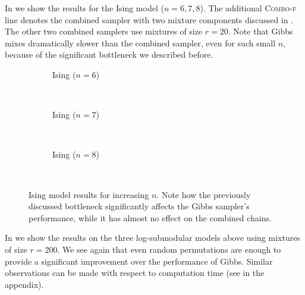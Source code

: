 In  we show the results for the Ising model ($n = 6, 7, 8$).
The additional \textsc{Combo-f} line denotes the combined sampler with two mixture components discussed in .
The other two combined samplers use mixtures of size $r = 20$.
Note that Gibbs mixes dramatically slower than the combined sampler, even for such small $n$, because of the significant bottleneck we described before.

\setlength{}
\setlength{}
\renewcommand{\subflen}{1.0\textwidth}
\begin{figure}[htbp]
  \begin{subfigure}[b]{\subflen}
    \centering
    
    \vspace{-0.5em}
    \caption{\textsf{Ising} ($n = 6$)}
    \label{fig:ising6}
  \end{subfigure}\\[1em]
  \begin{subfigure}[b]{\subflen}
    \centering
    
    \vspace{-0.5em}
    \caption{\textsf{Ising} ($n = 7$)}
    \label{fig:ising7}
  \end{subfigure}\\[1em]
  \begin{subfigure}[b]{\subflen}
    \centering
    
    \vspace{-0.5em}
    \caption{\textsf{Ising} ($n = 8$)}
    \label{fig:ising8}
  \end{subfigure}\\[-0.5em]
  \caption{
    Ising model results for increasing $n$.
    Note how the previously discussed bottleneck significantly affects the Gibbs sampler's performance, while it has almost no effect on the combined chains.
    }
  \label{fig:expising}
\end{figure}

In  we show the results on the three log-submodular models above using mixtures of size $r = 200$.
We see again that even random permutations are enough to provide a significant improvement over the performance of Gibbs.
Similar observations can be made with respect to computation time (see  in the appendix).

